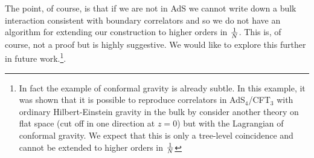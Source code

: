 The point, of course, is that if we are not in AdS we cannot write down a bulk interaction consistent with boundary correlators and so we do not have an algorithm for extending our construction to higher orders in ${1 \over N}$. This is, of course, not a proof but is highly suggestive. We would like to explore this further in future work.\footnote{In fact the example of conformal gravity \cite{Maldacena:2011mk} is already subtle. In this example, it was shown that it is possible to reproduce correlators in AdS$_4$/CFT$_3$ with ordinary Hilbert-Einstein gravity in the bulk by consider another theory on  flat space (cut off in one direction at $z = 0$) but with the Lagrangian of conformal gravity. We expect that this is only a tree-level coincidence and cannot be extended to higher orders in ${1 \over N}$}.













